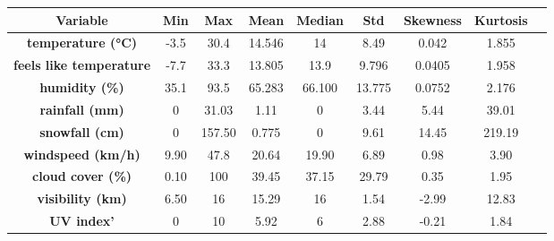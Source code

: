 \begin{tabular}{|c|c|c|c|c|c|c|c|c|}
	\hline
	\multicolumn{1}{|c|}{\textbf{Variable}} & \textbf{Min} & \textbf{Max} & \textbf{Mean} & \textbf{Median} & \textbf{Std} & \textbf{Skewness}  & 
	\multicolumn{1}{c|}{\textbf{Kurtosis}}\\
	\hline
	\textbf{temperature (°C)} & -3.5 & 30.4 & 14.546 & 14 & 8.49 & 0.042 & 1.855\\
	\hline
	\textbf{feels like temperature} & -7.7 & 33.3 & 13.805 & 13.9 & 9.796 & 0.0405 & 1.958 \\
	\hline
	\textbf{humidity (\%)} & 35.1 & 93.5 & 65.283 & 66.100 & 13.775 & 0.0752 & 2.176 \\
	\hline
	\textbf{rainfall (mm)} & 0 & 31.03 & 1.11 & 0 & 3.44 & 5.44 & 39.01\\
	\hline
	\textbf{snowfall (cm)} & 0 & 157.50 & 0.775 & 0 & 9.61 & 14.45 & 219.19\\
	\hline
	\textbf{windspeed (km/h)} & 9.90 & 47.8 & 20.64 & 19.90 & 6.89 & 0.98 & 3.90\\
	\hline
	\textbf{cloud cover (\%)} & 0.10 & 100 & 39.45 & 37.15 & 29.79 & 0.35 & 1.95\\
	\hline
	\textbf{visibility (km)} & 6.50 & 16 & 15.29 & 16 & 1.54 & -2.99 & 12.83\\
	\hline
	\textbf{UV index'} & 0 & 10 & 5.92 & 6 & 2.88 & -0.21 & 1.84\\
	\hline
	

\end{tabular}
\\
\\
